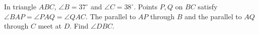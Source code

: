 In triangle $ABC$, $\angle B=37^\circ$ and $\angle C=38^\circ$. Points $P,Q$ on $BC$ satisfy $\angle BAP=\angle PAQ=\angle QAC$. The parallel to $AP$ through $B$ and the parallel to $AQ$ through $C$ meet at $D$. Find $\angle DBC$.
